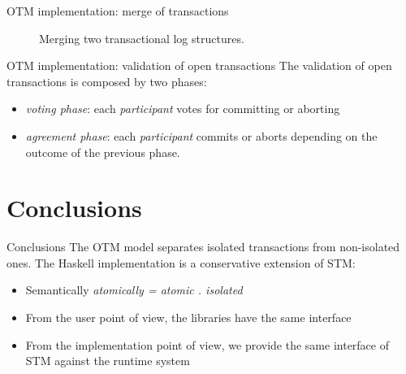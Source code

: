 \documentclass[beamer={noamsthm,10pt},target=bach]{thud}[2014/03/11]
\begin{document}
\begin{frame}[fragile]{OTM implementation: merge of transactions}
\begin{figure}
    \caption{Merging two transactional log structures.}
    \label{fig:implementation-setrefdiag}
\end{figure}


\end{frame}

\begin{frame}{OTM implementation: validation of open transactions}
The validation of open transactions is composed by two phases:
\begin{itemize}
\item \emph{voting phase}: each \emph{participant} votes for committing or aborting
\item \emph{agreement phase}: each \emph{participant} commits or aborts depending on the outcome of the previous phase. 
\end{itemize}
\end{frame}

\section{Conclusions}
\begin{frame}{Conclusions}
The OTM model separates isolated transactions from non-isolated ones.
The Haskell implementation is a conservative extension of STM:
\begin{itemize}
\item Semantically \emph{atomically = atomic . isolated}
\item From the user point of view, the libraries have the same interface
\item From the implementation point of view, we provide the same interface of STM against the runtime system
\end{itemize}
\end{frame}


\end{document}
